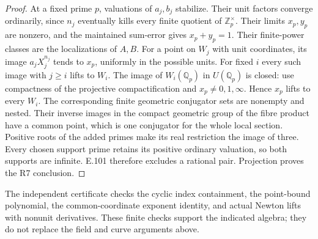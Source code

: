 \begin{proof}
At a fixed prime \(p\), valuations of \(a_j,b_j\) stabilize. Their
unit factors converge ordinarily, since \(n_j\) eventually kills every
finite quotient of \(\mathbb Z_p^\times\). Their limits \(x_p,y_p\)
are nonzero, and the maintained sum-error gives \(x_p+y_p=1\).
Their finite-power classes are the localizations of \(A,B\).
For a point on \(W_j\) with unit coordinates, its image
\(a_jX_j^{n_j}\) tends to \(x_p\), uniformly in the possible units.
For fixed \(i\) every such image with \(j\ge i\) lifts to \(W_i\).
The image of \(W_i(\mathbb Q_p)\) in \(U(\mathbb Q_p)\) is closed:
use compactness of the projective compactification and
\(x_p\ne0,1,\infty\). Hence \(x_p\) lifts to every \(W_i\).
The corresponding finite geometric conjugator sets are nonempty and
nested. Their inverse images in the compact geometric group of the
fibre product have a common point, which is one conjugator for the
whole local section. Positive roots of the added primes make its real
restriction the image of three. Every chosen support prime retains its
positive ordinary valuation, so both supports are infinite. E.101
therefore excludes a rational pair. Projection proves the R7 conclusion.
\end{proof}

The independent certificate 
checks the cyclic index containment, the point-bound polynomial, the
common-coordinate exponent identity, and actual Newton lifts with
nonunit derivatives. These finite checks support the indicated algebra;
they do not replace the field and curve arguments above.
